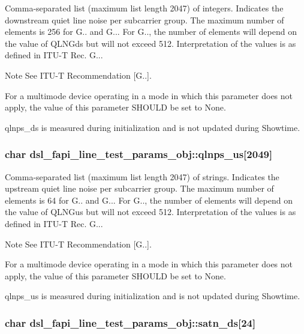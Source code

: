 Comma-\/separated list (maximum list length 2047) of integers. Indicates the downstream quiet line noise per subcarrier group. The maximum number of elements is 256 for G.. and G... For G.., the number of elements will depend on the value of Q\-L\-N\-Gds but will not exceed 512. Interpretation of the values is as defined in I\-T\-U-\/\-T Rec. G... \begin{DoxyNote}{Note}
See I\-T\-U-\/\-T Recommendation \mbox{[}G..\mbox{]}. 

For a multimode device operating in a mode in which this parameter does not apply, the value of this parameter S\-H\-O\-U\-L\-D be set to None. 

qlnps\-\_\-ds is measured during initialization and is not updated during Showtime. 
\end{DoxyNote}
\hypertarget{structdsl__fapi__line__test__params__obj_a07497d9f33930bf1ab615c4ee4b5ed59}{
\subsubsection[{qlnps\-\_\-us}]{\setlength{\rightskip}{0pt plus 5cm}char dsl\-\_\-fapi\-\_\-line\-\_\-test\-\_\-params\-\_\-obj\-::qlnps\-\_\-us\mbox{[}2049\mbox{]}}}\label{structdsl__fapi__line__test__params__obj_a07497d9f33930bf1ab615c4ee4b5ed59}
Comma-\/separated list (maximum list length 2047) of strings. Indicates the upstream quiet line noise per subcarrier group. The maximum number of elements is 64 for G.. and G... For G.., the number of elements will depend on the value of Q\-L\-N\-Gus but will not exceed 512. Interpretation of the values is as defined in I\-T\-U-\/\-T Rec. G... \begin{DoxyNote}{Note}
See I\-T\-U-\/\-T Recommendation \mbox{[}G..\mbox{]}. 

For a multimode device operating in a mode in which this parameter does not apply, the value of this parameter S\-H\-O\-U\-L\-D be set to None. 

qlnps\-\_\-us is measured during initialization and is not updated during Showtime. 
\end{DoxyNote}
\hypertarget{structdsl__fapi__line__test__params__obj_ad5c0172d2a20781c58dbcb72a41871fa}{
\subsubsection[{satn\-\_\-ds}]{\setlength{\rightskip}{0pt plus 5cm}char dsl\-\_\-fapi\-\_\-line\-\_\-test\-\_\-params\-\_\-obj\-::satn\-\_\-ds\mbox{[}24\mbox{]}}}\label{structdsl__fapi__line__test__params__obj_ad5c0172d2a20781c58dbcb72a41871fa}

